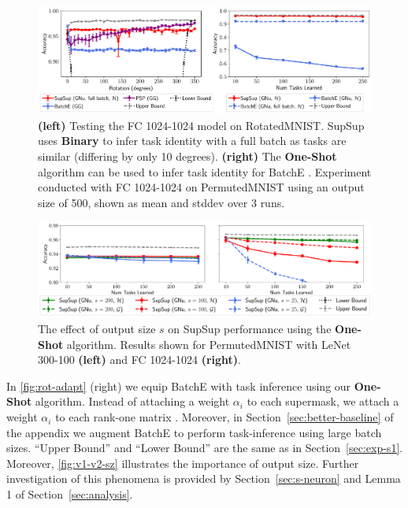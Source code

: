 \documentclass{article}
\newcommand{\ac}{SupSup\xspace}
\begin{document}
\begin{figure}[t]
    \centering
    \includegraphics[width=\textwidth]{figs/rotate_adapt.pdf}
    \caption{\textbf{(left)} Testing the FC 1024-1024 model on RotatedMNIST. \ac uses \textbf{Binary} to infer task identity with a full batch as tasks are similar (differing by only 10 degrees). \textbf{(right)} The \textbf{One-Shot} algorithm can be used to infer task identity for BatchE \cite{wen2020batchensemble}. Experiment conducted with FC 1024-1024 on PermutedMNIST using an output size of 500, shown as mean and stddev over 3 runs.}
    \label{fig:rot-adapt}
    \vspace{-1em}
\end{figure}

\begin{figure}[t]
    \centering
    \includegraphics[width=\textwidth]{figs/v1-v2-sz.pdf}
    \caption{The effect of output size $s$ on \ac performance using the \textbf{One-Shot} algorithm. Results shown for PermutedMNIST with LeNet 300-100 \textbf{(left)} and FC 1024-1024 \textbf{(right)}.}
    \label{fig:v1-v2-sz}
    \vspace{-1.5em}
\end{figure}

In \autoref{fig:rot-adapt} (right) we equip BatchE with task inference using our \textbf{One-Shot} algorithm. Instead of attaching a weight $\alpha_i$ to each supermask, we attach a weight $\alpha_i$ to each rank-one matrix \cite{wen2020batchensemble}. Moreover, in Section~\ref{sec:better-baseline} of the appendix we augment BatchE to perform task-inference using large batch sizes.
``Upper Bound'' and ``Lower Bound'' are the same as in Section~\ref{sec:exp-s1}. Moreover, \autoref{fig:v1-v2-sz} illustrates the importance of output size. Further investigation of this phenomena is provided by Section~\ref{sec:s-neuron} and Lemma 1 of Section~\ref{sec:analysis}. 
\end{document}
